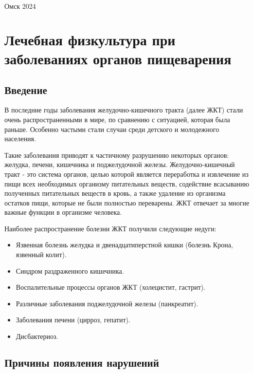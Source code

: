 \documentclass[a4paper]{article}
\begin{document}
    \vspace*{\fill}
    \begin{center}
        Омск 2024
    \end{center}

    \newpage

    \tableofcontents

    \newpage

    \section{Лечебная физкультура при заболеваниях органов пищеварения}

    \subsection{Введение}
    
    В последние годы заболевания желудочно-кишечного тракта (далее ЖКТ) стали очень распространенными в мире, по сравнению с ситуацией, которая была раньше. Особенно частыми стали случаи среди детского и молодежного населения.

    Такие заболевания приводят к частичному разрушению некоторых органов: желудка, печени, кишечника и поджелудочной железы. Желудочно-кишечный тракт - это система органов, целью которой является переработка и извлечение из пищи всех необходимых организму питательных веществ, содействие всасыванию полученных питательных веществ в кровь, а также удаление из организма остатков пищи, которые не были полностью переварены. ЖКТ отвечает за многие важные функции в организме человека.

    Наиболее распространение болезни ЖКТ получили следующие недуги:
    \begin{itemize}
        \item Язвенная болезнь желудка и двенадцатиперстной кишки (болезнь Крона, язвенный колит).
        \item Синдром раздраженного кишечника.
        \item Воспалительные процессы органов ЖКТ (холецистит, гастрит).
        \item Различные заболевания поджелудочной железы (панкреатит). 
        \item Заболевания печени (цирроз, гепатит).
        \item Дисбактериоз.
    \end{itemize}

    \subsection{Причины появления нарушений}
\end{document}
